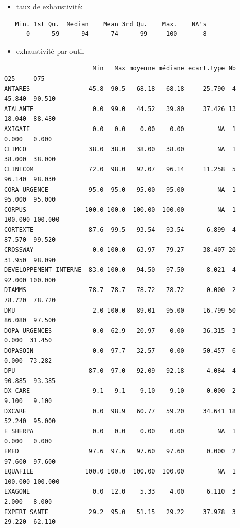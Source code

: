 \documentclass[]{article}
\providecommand{\tightlist}{%
  \setlength{\itemsep}{0pt}\setlength{\parskip}{0pt}}
\begin{document}
\begin{itemize}
\tightlist
\item
  taux de exhaustivité:
\end{itemize}

\begin{verbatim}
   Min. 1st Qu.  Median    Mean 3rd Qu.    Max.    NA's 
      0      59      94      74      99     100       8 
\end{verbatim}

\begin{itemize}
\tightlist
\item
  exhaustivité par outil
\end{itemize}

\begin{verbatim}
                        Min   Max moyenne médiane ecart.type Nb     Q25     Q75
ANTARES                45.8  90.5   68.18   68.18     25.790  4  45.840  90.510
ATALANTE                0.0  99.0   44.52   39.80     37.426 13  18.040  88.480
AXIGATE                 0.0   0.0    0.00    0.00         NA  1   0.000   0.000
CLIMCO                 38.0  38.0   38.00   38.00         NA  1  38.000  38.000
CLINICOM               72.0  98.0   92.07   96.14     11.258  5  96.140  98.030
CORA URGENCE           95.0  95.0   95.00   95.00         NA  1  95.000  95.000
CORPUS                100.0 100.0  100.00  100.00         NA  1 100.000 100.000
CORTEXTE               87.6  99.5   93.54   93.54      6.899  4  87.570  99.520
CROSSWAY                0.0 100.0   63.97   79.27     38.407 20  31.950  98.090
DEVELOPPEMENT INTERNE  83.0 100.0   94.50   97.50      8.021  4  92.000 100.000
DIAMMS                 78.7  78.7   78.72   78.72      0.000  2  78.720  78.720
DMU                     2.0 100.0   89.01   95.00     16.799 50  86.080  97.500
DOPA URGENCES           0.0  62.9   20.97    0.00     36.315  3   0.000  31.450
DOPASOIN                0.0  97.7   32.57    0.00     50.457  6   0.000  73.282
DPU                    87.0  97.0   92.09   92.18      4.084  4  90.885  93.385
DX CARE                 9.1   9.1    9.10    9.10      0.000  2   9.100   9.100
DXCARE                  0.0  98.9   60.77   59.20     34.641 18  52.240  95.000
E SHERPA                0.0   0.0    0.00    0.00         NA  1   0.000   0.000
EMED                   97.6  97.6   97.60   97.60      0.000  2  97.600  97.600
EQUAFILE              100.0 100.0  100.00  100.00         NA  1 100.000 100.000
EXAGONE                 0.0  12.0    5.33    4.00      6.110  3   2.000   8.000
EXPERT SANTE           29.2  95.0   51.15   29.22     37.978  3  29.220  62.110

\end{verbatim}
\end{document}
